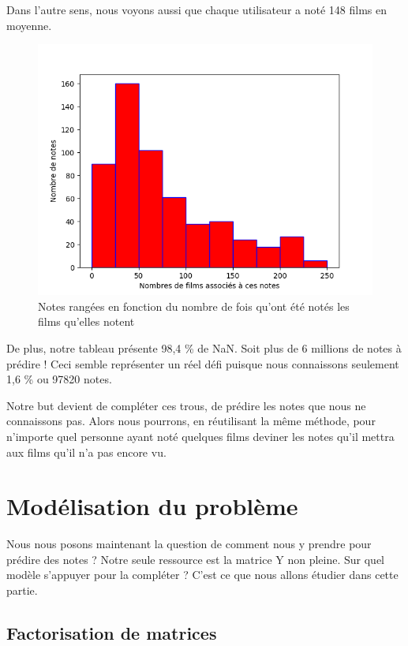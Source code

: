 \documentclass[a4paper,10pt]{article}
\begin{document}
Dans l’autre sens, nous voyons aussi que chaque utilisateur a noté 148 films en moyenne.

\begin{figure}[H]
  \centering
\includegraphics[scale=0.5]{hist1.png}
\caption{Notes rangées en fonction du nombre de fois qu'ont été notés les films qu'elles notent}
\end{figure}

De plus, notre tableau présente 98,4 \% de NaN. Soit plus de 6 millions de notes à prédire ! Ceci semble représenter un réel défi puisque nous connaissons seulement 1,6 \% ou 97820 notes.

Notre but devient de compléter ces trous, de prédire les notes que nous ne connaissons pas. Alors nous pourrons, en réutilisant la même méthode, pour n'importe quel personne ayant noté quelques films deviner les notes qu'il mettra aux films qu'il n'a pas encore vu.

\section{Modélisation du problème}

Nous nous posons maintenant la question de comment nous y prendre pour prédire des notes ?
Notre seule ressource est la matrice Y non pleine. Sur quel modèle s'appuyer pour la compléter ?
C'est ce que nous allons étudier dans cette partie.

\subsection{Factorisation de matrices}
\end{document}
